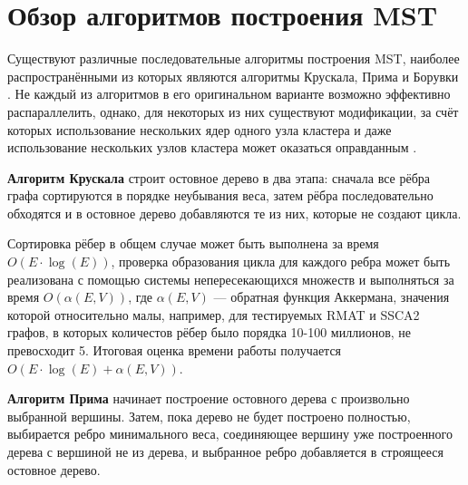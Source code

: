 \documentclass[a4paper,10pt]{extarticle}
\begin{document}

\newpage
\section{Обзор алгоритмов построения MST}
Существуют различные последовательные алгоритмы построения MST, наиболее распространёнными из которых являются алгоритмы Крускала, Прима и Борувки \cite{cormen}.
Не каждый из алгоритмов в его оригинальном варианте возможно эффективно распараллелить, однако, для некоторых из них существуют модификации, за счёт которых использование нескольких ядер одного узла кластера и даже использование нескольких узлов кластера может оказаться оправданным \cite{boruvka-prima,kruskal-parallel}.


\textbf{Алгоритм Крускала} строит остовное дерево в два этапа: сначала все рёбра графа сортируются в порядке неубывания веса, затем рёбра последовательно обходятся и в остовное дерево добавляются те из них, которые не создают цикла.

Сортировка рёбер в общем случае может быть выполнена за время $O(E \cdot \log(E))$, проверка образования цикла для каждого ребра может быть реализована с помощью системы непересекающихся множеств и выполняться за время $O(\alpha(E, V))$, где $\alpha(E, V)$ --- обратная функция Аккермана, значения которой относительно малы, например, для тестируемых RMAT и SSCA2 графов, в которых количестов рёбер было порядка 10-100 миллионов, не превосходит 5. Итоговая оценка времени работы получается $O(E \cdot \log(E) + \alpha(E, V))$.


\textbf{Алгоритм Прима} начинает построение остовного дерева с произвольно выбранной вершины. Затем, пока дерево не будет построено полностью, выбирается ребро минимального веса, соединяющее вершину уже построенного дерева с вершиной не из дерева, и выбранное ребро добавляется в строящееся остовное дерево.
\end{document}

